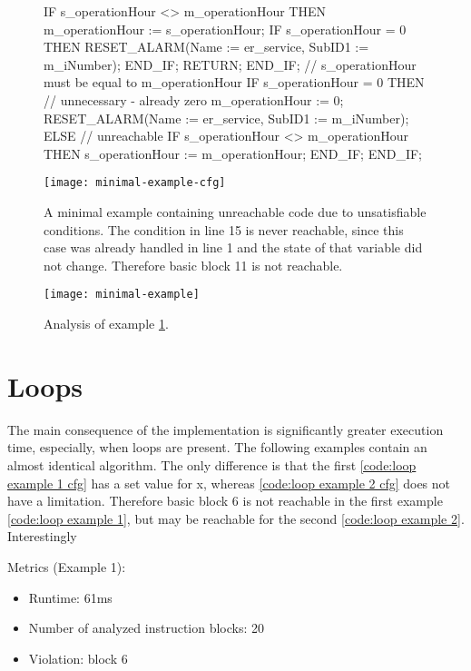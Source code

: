 \begin{figure}[h!]
	\begin{GenericCode}
		IF s_operationHour <> m_operationHour THEN
			m_operationHour := s_operationHour;
			IF s_operationHour = 0 THEN
				RESET_ALARM(Name := er_service, SubID1 := m_iNumber);
			END_IF;
			RETURN;
		END_IF;
		// s_operationHour must be equal to m_operationHour
		IF s_operationHour = 0 THEN
			// unnecessary - already zero
			m_operationHour := 0;
			RESET_ALARM(Name := er_service, SubID1 := m_iNumber);
		ELSE
			// unreachable
			IF s_operationHour <> m_operationHour THEN
				s_operationHour := m_operationHour;
			END_IF;
		END_IF;	\end{GenericCode}
	\centering

	\texttt{[image: minimal-example-cfg]}
	\caption{A minimal example containing unreachable code due to unsatisfiable conditions. The condition in line 15 is never reachable, since this case was already handled in line 1 and the state of that variable did not change. Therefore basic block 11 is not reachable.}
	\label{code:basic example 1 cfg}
\end{figure}

\begin{figure}[h!]
	\centering
	\texttt{[image: minimal-example]}
	\caption{Analysis of example \ref{code:basic example 1 cfg}. }
	\label{code:basic example 1}
\end{figure}

\section{Loops}
The main consequence of the implementation is significantly greater execution time, especially, when loops are present.
The following examples contain an almost identical algorithm. The only difference is that the first \ref{code:loop example 1 cfg} has a set value for x, whereas \ref{code:loop example 2 cfg} does not have a limitation. Therefore basic block 6 is not reachable in the first example \ref{code:loop example 1}, but may be reachable for the second \ref{code:loop example 2}.
Interestingly 


Metrics (Example 1):
\begin{itemize}
	\item Runtime: 61ms
	\item Number of analyzed instruction blocks: 20
	\item Violation: block 6
\end{itemize}



